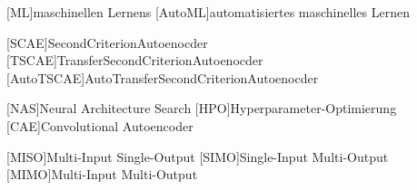 \begin{acronym}[IEEE]
	[ML]{maschinellen Lernens}
	[AutoML]{automatisiertes maschinelles Lernen}
	
	[SCAE]{SecondCriterionAutoenocder}
	[TSCAE]{TransferSecondCriterionAutoenocder}
	[AutoTSCAE]{AutoTransferSecondCriterionAutoenocder}
	
	[NAS]{Neural Architecture Search}
	[HPO]{Hyperparameter-Optimierung}	
	[CAE]{Convolutional Autoencoder}	
	
	[MISO]{Multi-Input Single-Output}	
	[SIMO]{Single-Input Multi-Output}	
	[MIMO]{Multi-Input Multi-Output}	
\end{acronym}
